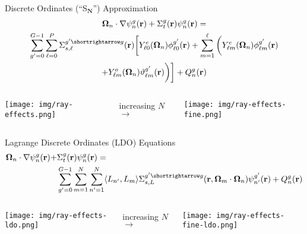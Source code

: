 \documentclass[handout]{beamer} %
\newcommand{\bo}{\mathbf\Omega}
\newcommand{\vecr}{\textbf{r}}
\newcommand{\sa}{\shortrightarrow}
\newcommand{\Ye}[2]{\ensuremath{Y^e_{#1}(\bo_#2)}}
\newcommand{\Yo}[2]{\ensuremath{Y^o_{#1}(\bo_#2)}}
\begin{document}
\begin{frame}{Discrete Ordinates (``S$_\mathbf{N}$'') Approximation}
%
\vspace{-2em}
%
\begin{multline*}
\bo_n \cdot \nabla \psi_n^g(\vecr) + \Sigma_t^g(\vecr)\psi_n^g(\vecr) = \\
\sum_{g'=0}^{G-1}\sum_{\ell=0}^{P}\Sigma_{s,\ell}^{g'\sa g}(\vecr)
\bigg[\Ye{\ell 0}{n}\phi_{\ell 0}^{g'}(\vecr) + \sum_{m=1}^{\ell}
\bigg(\Ye{\ell m}{n}\phi_{\ell m}^{g'}(\vecr) \\
 + \Yo{\ell m}{n}\vartheta_{\ell m}^{g'}(\vecr)\bigg)\bigg]
+ Q_n^g(\vecr)
\end{multline*}
%
\pause
%
\begin{columns}
\begin{column}{0.4\textwidth}
\texttt{[image: img/ray-effects.png]}
\end{column}
\pause
\begin{column}{0.2\textwidth}
\center\large increasing $N$
\vspace{-1.5em}
\center\Huge$\rightarrow$
\end{column}
\begin{column}{0.4\textwidth}
\texttt{[image: img/ray-effects-fine.png]}
\end{column}
\end{columns}
%
\end{frame}

\begin{frame}{Lagrange Discrete Ordinates (LDO) Equations \nocite{ahrens}}
%
\vspace{-2em}
\begin{align*}
\bo_n\cdot\nabla\psi_{n}^g(\vecr) + 
&\Sigma_{t}^g(\vecr)\psi_{n}^g(\vecr) = \\
&\sum_{g'=0}^{G-1}\sum_{m=1}^{N}\sum_{n'=1}^{N}\langle L_{n'},L_{m}\rangle
\Sigma_{s,L}^{g'\sa g}(\vecr,\bo_{m}\cdot\bo_n)\psi_{n'}^{g'}(\vecr)
+ Q_{n}^g(\vecr)
\end{align*}
%
\pause
%
\begin{columns}
\begin{column}{0.4\textwidth}
\texttt{[image: img/ray-effects-ldo.png]}
\end{column}
\pause
\begin{column}{0.2\textwidth}
\center\large increasing $N$
\vspace{-1.5em}
\center\Huge$\rightarrow$
\end{column}
\begin{column}{0.4\textwidth}
\texttt{[image: img/ray-effects-fine-ldo.png]}
\end{column}
\end{columns}
%
\end{frame}
\end{document}

